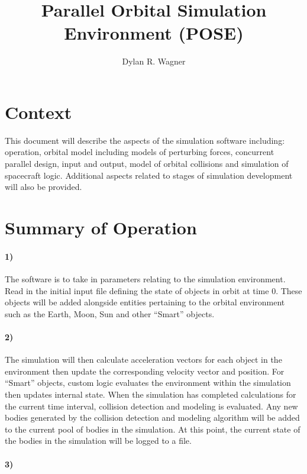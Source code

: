 \documentclass{article}
\title{Parallel Orbital Simulation Environment (POSE)}
\author{Dylan R. Wagner}
\begin{document}
  \maketitle
  
  \section{Context}
  
  This document will describe the aspects of the simulation software including: operation, orbital model including models of perturbing forces, concurrent parallel design, input and output, model of orbital collisions and simulation of spacecraft logic. Additional aspects related to stages of simulation development will also be provided.
  
  \section{Summary of Operation}
  
  \paragraph{1)}
  
  The software is to take in parameters relating to the simulation environment. Read in the initial input file defining the state of objects in orbit at time 0. These objects will be added alongside entities pertaining to the orbital environment such as the Earth, Moon, Sun and other “Smart” objects. 
  
  \paragraph{2)}
  
  The simulation will then calculate acceleration vectors for each object in the environment then update the corresponding velocity vector and position. For “Smart” objects, custom logic evaluates the environment within the simulation then updates internal state. When the simulation has completed calculations for the current time interval, collision detection and modeling is evaluated. Any new bodies generated by the collision detection and modeling algorithm will be added to the current pool of bodies in the simulation. At this point, the current state of the bodies in the simulation will be logged to a file.
  
  \paragraph{3)}
  
\end{document}
